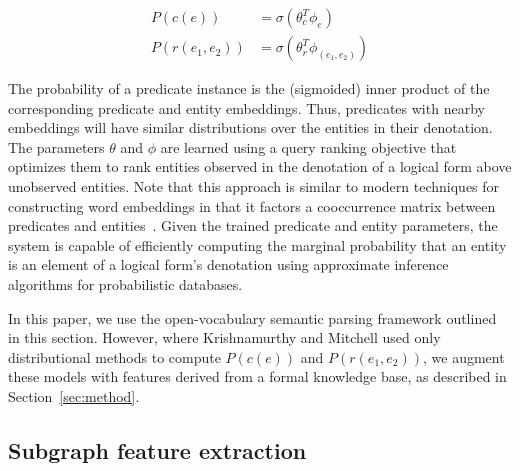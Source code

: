 \documentclass[11pt]{article}
\newcommand{\secref}[1]{Section~\ref{sec:#1}}
\begin{document}
\begin{align*}
  P(c(e)) &= \sigma ( \theta_c^T \phi_e ) \\
  P(r(e_1, e_2)) &= \sigma ( \theta_r^T \phi_{(e_1, e_2)} )
\end{align*}

The probability of a predicate instance is the (sigmoided) inner product of the
corresponding predicate and entity embeddings. Thus, predicates with nearby
embeddings will have similar distributions over the entities in their
denotation. The parameters $\theta$ and $\phi$ are learned using a query
ranking objective that optimizes them to rank entities observed in the
denotation of a logical form above unobserved entities. Note that this approach
is similar to modern techniques for constructing word embeddings in that it
factors a cooccurrence matrix between predicates and
entities~\cite{levy-2014-w2v-as-mf}. Given the trained predicate and entity
parameters, the system is capable of efficiently computing the marginal
probability that an entity is an element of a logical form's denotation using
approximate inference algorithms for probabilistic databases.

In this paper, we use the open-vocabulary semantic parsing framework outlined
in this section.  However, where Krishnamurthy and Mitchell used only
distributional methods to compute $P(c(e))$ and $P(r(e_1, e_2))$, we augment
these models with features derived from a formal knowledge base, as described
in \secref{method}.

\subsection{Subgraph feature extraction}
\end{document}
